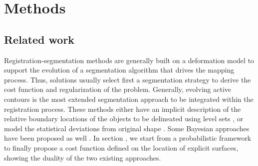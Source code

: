 \section*{Methods}
\label{sec:methods}
%
\subsection*{Related work}
\label{sec:methods_background}
Registration-segmentation methods are generally built on a deformation model to
  support the evolution of a segmentation algorithm that drives the mapping process.
Thus, solutions usually select first a segmentation strategy to derive the cost function and
  regularization of the problem.
Generally, evolving active contours is the most extended segmentation approach to be
  integrated within the registration process.
These methods either have an implicit description of the relative boundary locations of the
  objects to be delineated using level sets \citep{chen_using_2002,bresson_variational_2006,
  chan_level_2005}, or model the statistical deviations from original shape
  \citep{cremers_kernel_2006,gastaud_combining_2004}.
Some Bayesian approaches have been proposed as well
  \citep{wyatt_map_2003,pohl_bayesian_2006,gass_simultaneous_2014}.
In section , we start from a probabilistic framework to finally propose
	a cost function defined on the location of explicit surfaces, showing the duality of the
	two existing approaches.


